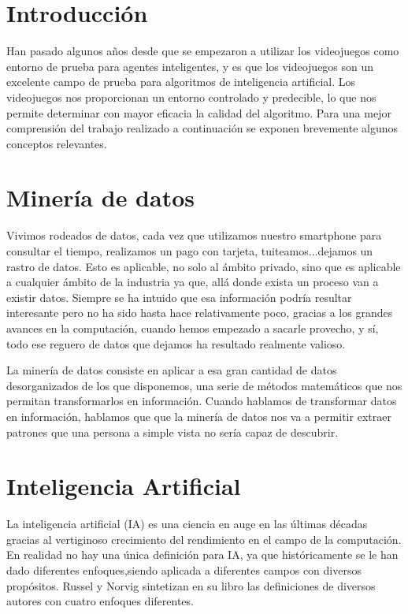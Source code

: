 



\section{Introducción}
Han pasado algunos años desde que se empezaron a utilizar los videojuegos como entorno de prueba para agentes inteligentes, y es que los videojuegos son un excelente campo de prueba para algoritmos de inteligencia artificial. Los videojuegos nos proporcionan un entorno controlado y predecible, lo que nos permite determinar con mayor eficacia la calidad del algoritmo. Para una mejor comprensión del trabajo realizado a continuación se exponen brevemente algunos conceptos relevantes.

\section{Minería de datos}
Vivimos rodeados de datos, cada vez que utilizamos nuestro smartphone para consultar el tiempo, realizamos un pago con tarjeta, tuiteamos...dejamos un rastro de datos. Esto es aplicable, no solo al ámbito privado, sino que es aplicable a cualquier ámbito de la industria ya que, allá donde exista un proceso van a existir datos. Siempre se ha intuido que esa información podría resultar interesante pero no ha sido hasta hace relativamente poco, gracias a los grandes avances en la computación, cuando hemos empezado a sacarle provecho, y sí, todo ese reguero de datos que dejamos ha resultado realmente valioso.

La minería de datos consiste en aplicar a esa gran cantidad de datos desorganizados de los que disponemos, una serie de métodos matemáticos que nos permitan transformarlos en información. Cuando hablamos de transformar datos en información, hablamos que que la minería de datos nos va a permitir extraer patrones que una persona a simple vista no sería capaz de descubrir. 

\section{Inteligencia Artificial}
La inteligencia artificial (IA) es una ciencia en auge en las últimas décadas gracias al vertiginoso crecimiento del rendimiento en el campo de la computación. En realidad no hay una única definición para IA, ya que históricamente se le han dado diferentes enfoques,siendo aplicada a diferentes campos con diversos propósitos. \cite{Russell_Norvig} Russel y Norvig sintetizan en su libro las definiciones de diversos autores con cuatro enfoques diferentes.


